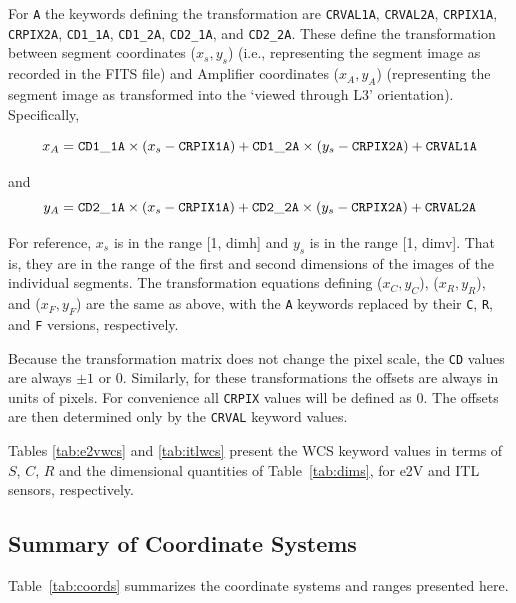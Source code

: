 \documentclass{article}[12pt]
\begin{document}
For {\tt A} the keywords defining the transformation are {\tt CRVAL1A}, {\tt CRVAL2A}, {\tt CRPIX1A}, {\tt CRPIX2A}, {\tt CD1\_1A}, {\tt CD1\_2A}, {\tt CD2\_1A}, and {\tt CD2\_2A}.  These define the transformation between segment coordinates ($x_s, y_s$) (i.e., representing the segment image as recorded in the FITS file) and Amplifier coordinates ($x_A, y_A$) (representing the segment image as transformed into the `viewed through L3' orientation).  Specifically,

\begin{equation}
x_A = {\tt CD1\_1A} \times (x_s -{\tt CRPIX1A}) + {\tt CD1\_2A} \times (y_s - {\tt CRPIX2A}) + {\tt CRVAL1A}
\end{equation}

and
\begin{equation}
y_A = {\tt CD2\_1A} \times (x_s - {\tt CRPIX1A}) + {\tt CD2\_2A} \times (y_s - {\tt CRPIX2A}) + {\tt CRVAL2A}
\end{equation}

For reference, $x_s$ is in the range [1, dimh] and $y_s$ is in the range [1, dimv].  That is, they are in the range of the first and second dimensions of the images of the individual segments.  The transformation equations defining ($x_C, y_C$), ($x_R, y_R$), and ($x_F, y_F$) are the same as above, with the {\tt A} keywords replaced by their {\tt C}, {\tt R}, and {\tt F} versions, respectively.

Because the transformation matrix does not change the pixel scale, the {\tt CD} values are always $\pm1$ or 0.  Similarly, for these transformations the offsets are always in units of pixels.  For convenience all {\tt CRPIX} values will be defined as 0.  The offsets are then determined only by the {\tt CRVAL} keyword values.

Tables \ref{tab:e2vwcs} and \ref{tab:itlwcs} present the WCS keyword values in terms of $S$, $C$, $R$ and the dimensional quantities of Table~\ref{tab:dims}, for e2V and ITL sensors, respectively.  

\subsection{Summary of Coordinate Systems}
Table~\ref{tab:coords} summarizes the coordinate systems and ranges presented here.
\end{document}
